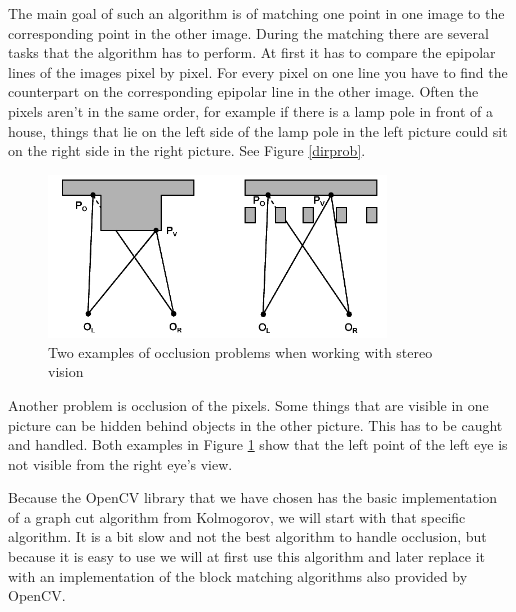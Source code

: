 \documentclass[a4paper]{article}
\begin{document}
The main goal of such an algorithm is of matching one point in one image to
the corresponding point in the other image. During the matching there are
several tasks that the algorithm has to perform. At first it has to compare
the epipolar lines of the images pixel by pixel. For every pixel on one
line you have to find the counterpart on the corresponding epipolar line in
the other image. Often the pixels aren't in the same order, for example if
there is a lamp pole in front of a house, things that lie on the left side
of the lamp pole in the left picture could sit on the right side in the
right picture. See Figure \ref{dirprob}.

\begin{figure} [h!tb]
\centering
\includegraphics[width=0.8\textwidth]{matching_problems_occlusion}
\caption{Two examples of occlusion problems when working with stereo
vision}
\label{occprob} 
\end{figure}

Another problem is occlusion of the pixels. Some things that are visible in one
picture can be hidden behind objects in the other picture. This has to be caught
and handled. Both examples in Figure \ref{occprob} show that the left point of
the left eye is not visible from the right eye's view.

Because the OpenCV library that we have chosen has the basic implementation of a
graph cut algorithm from Kolmogorov\cite{kolmogorov2003}, we will start with
that specific algorithm. It is a bit slow and not the best algorithm to handle
occlusion, but because it is easy to use we will at first use this algorithm and
later replace it with an implementation of the block matching algorithms also
provided by OpenCV. 
\end{document}
